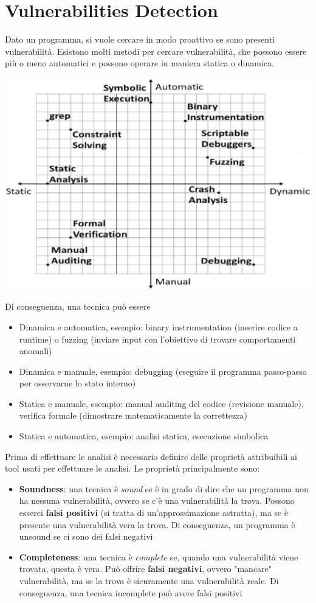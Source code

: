 
\section{Vulnerabilities Detection}

Dato un programma, si vuole cercare in modo proattivo se sono presenti vulnerabilità. Esistono molti metodi per cercare vulnerabilità, che possono essere più o meno automatici e possono operare in maniera statica o dinamica.
\begin{center}
	\includegraphics[width=0.6\linewidth]{img/vulnerabilities/manaut}
\end{center}
Di conseguenza, una tecnica può essere
\begin{itemize}
	\item Dinamica e automatica, esempio: binary instrumentation (inserire codice a runtime) o fuzzing (inviare input con l'obiettivo di trovare comportamenti anomali)
	\item Dinamica e manuale, esempio: debugging (eseguire il programma passo-passo per osservarne lo stato interno)
	\item Statica e manuale, esempio: manual auditing del codice (revisione manuale), verifica formale (dimostrare matematicamente la correttezza)
	\item Statica e automatica, esempio: analisi statica, esecuzione simbolica
\end{itemize}


Prima di effettuare le analisi è necessario definire delle proprietà attribuibili ai tool usati per effettuare le analisi. Le proprietà principalmente sono:
\begin{itemize}
	\item \textbf{Soundness}: una tecnica è \textit{sound} se è in grado di dire che un programma non ha nessuna vulnerabilità, ovvero se c'è una vulnerabilità la trova. Possono esserci \textbf{falsi positivi} (si tratta di un'approssimazione astratta), ma se è presente una vulnerabilità vera la trova. Di conseguenza, un programma è unsound se ci sono dei falsi negativi
	\item \textbf{Completeness}: una tecnica è \textit{complete} se, quando una vulnerabilità viene trovata, questa è vera. Può offrire \textbf{falsi negativi}, ovvero "mancare" vulnerabilità, ma se la trova è sicuramente una vulnerabilità reale. Di conseguenza, una tecnica incomplete può avere falsi positivi
\end{itemize}

